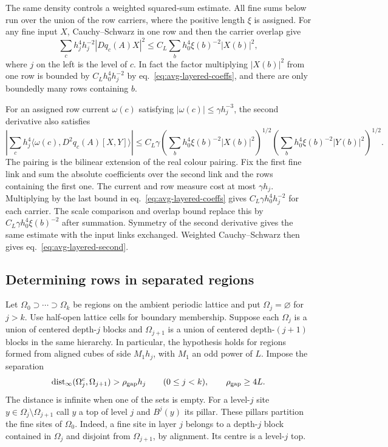 \documentclass[11pt,letterpaper,reqno]{amsart}
\numberwithin{equation}{section}
\renewcommand{\eqref}[1]{\textup{eq.~\ref{#1}}}
\theoremstyle{definition}
\theoremstyle{remark}
\begin{document}
The same density controls a weighted squared-sum estimate.
All fine sums below run over the union of the row carriers,
where the positive length $\xi$ is assigned.
For any fine input \(X\), Cauchy--Schwarz in one row and then
the carrier overlap give
\begin{equation}
 \sum_c h_j^4 h_j^{-2}|Dq_c(A)X|^2
 \leq C_L\sum_b h_0^4\xi(b)^{-2}|X(b)|^2,
 \label{eq:avg-layered-trace}
\end{equation}
where \(j\) on the left is the level of \(c\).
In fact the factor multiplying \(|X(b)|^2\) from one row is
bounded by \(C_Lh_0^4 h_j^{-2}\) by
\eqref{eq:avg-layered-coeffs}, and there are only boundedly
many rows containing \(b\).

For an assigned row current \(\omega(c)\) satisfying
\(|\omega(c)|\leq\gamma h_j^{-3}\), the second derivative
also satisfies
\begin{equation}\label{eq:avg-layered-second}
 \left|\sum_c h_j^4
     \langle\omega(c),D^2q_c(A)[X,Y]\rangle\right|
 \leq C_L\gamma
 \left(\sum_b h_0^4\xi(b)^{-2}|X(b)|^2\right)^{1/2}
 \left(\sum_b h_0^4\xi(b)^{-2}|Y(b)|^2\right)^{1/2}.
\end{equation}
The pairing is the bilinear extension of the real colour pairing.
Fix the first fine link and sum the absolute coefficients over
the second link and the rows containing the first one. The current
and row measure cost at most \(\gamma h_j\). Multiplying by the
last bound in \eqref{eq:avg-layered-coeffs} gives
\(C_L\gamma h_0^4 h_j^{-2}\) for each carrier. The scale comparison
and overlap bound replace this by \(C_L\gamma h_0^4\xi(b)^{-2}\)
after summation. Symmetry of the second derivative gives the
same estimate with the input links exchanged. Weighted
Cauchy--Schwarz then gives \eqref{eq:avg-layered-second}.

\subsection{Determining rows in separated regions}\label{sec:layered-geometry}

Let $\Omega_0\supset\cdots\supset\Omega_k$ be regions on the
ambient periodic lattice and put $\Omega_j=\varnothing$ for $j>k$. Use
half-open lattice cells for boundary membership. Suppose each
$\Omega_j$ is a union of centered depth-$j$ blocks and
$\Omega_{j+1}$ is a union of centered depth-$(j+1)$ blocks in the
same hierarchy. In particular, the hypothesis holds for regions
formed from aligned cubes of side $M_1 h_j$, with $M_1$ an odd
power of $L$. Impose the separation
\begin{equation}\label{eq:layered-separation}
 \operatorname{dist}_\infty(\Omega_j^c,\Omega_{j+1})>\rho_{\rm gap} h_j
 \qquad (0\le j<k),\qquad \rho_{\rm gap}\ge 4L.
\end{equation}
The distance is infinite when one of the sets is empty. For a
level-$j$ site $y\in\Omega_j\setminus\Omega_{j+1}$ call $y$ a
top of level $j$ and $B^j(y)$ its pillar. These pillars partition
the fine sites of $\Omega_0$. Indeed, a fine site in layer $j$
belongs to a depth-$j$ block contained in $\Omega_j$ and disjoint
from $\Omega_{j+1}$, by alignment. Its centre is a level-$j$ top.
\end{document}

